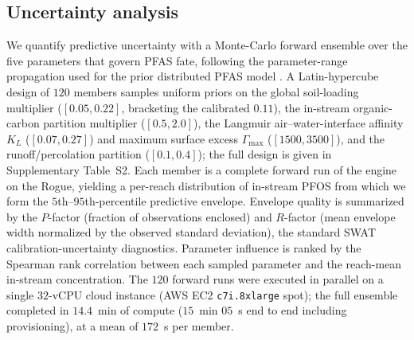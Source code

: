 \subsection{Uncertainty analysis}
We quantify predictive uncertainty with a Monte-Carlo forward ensemble over the five parameters that govern PFAS fate, following the parameter-range propagation used for the prior distributed PFAS model \citep{rafiei2023}. A Latin-hypercube design of $120$ members samples uniform priors on the global soil-loading multiplier ($[0.05,0.22]$, bracketing the calibrated $0.11$), the in-stream organic-carbon partition multiplier ($[0.5,2.0]$), the Langmuir air--water-interface affinity $K_L$ ($[0.07,0.27]$) and maximum surface excess $\Gamma_{\max}$ ($[1500,3500]$), and the runoff/percolation partition ($[0.1,0.4]$); the full design is given in Supplementary Table~S2. Each member is a complete forward run of the engine on the Rogue, yielding a per-reach distribution of in-stream PFOS from which we form the $5$th--$95$th-percentile predictive envelope. Envelope quality is summarized by the $P$-factor (fraction of observations enclosed) and $R$-factor (mean envelope width normalized by the observed standard deviation), the standard SWAT calibration-uncertainty diagnostics. Parameter influence is ranked by the Spearman rank correlation between each sampled parameter and the reach-mean in-stream concentration. The $120$ forward runs were executed in parallel on a single $32$-vCPU cloud instance (AWS EC2 \texttt{c7i.8xlarge} spot); the full ensemble completed in $14.4$~min of compute ($15$~min $05$~s end to end including provisioning), at a mean of $172$~s per member.

